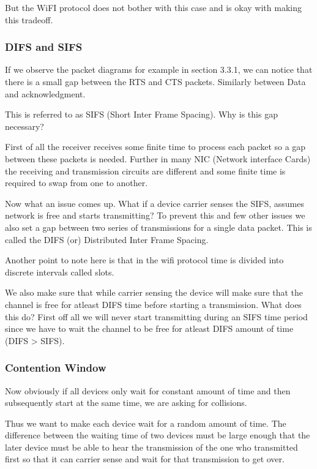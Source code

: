 \documentclass[12pt]{article}
\begin{document}
But the WiFI protocol does not bother with this case and is okay with making this tradeoff. 


\subsubsection{DIFS and SIFS}

If we observe the packet diagrams for example in section 3.3.1, we can notice that there 
is a small gap between the RTS and CTS packets. Similarly between Data and acknowledgment. 

This is referred to as SIFS (Short Inter Frame Spacing). Why is this gap necessary? 

First of all the receiver receives some finite time to process each packet so a gap between these 
packets is needed. Further in many NIC (Network interface Cards) the receiving and 
transmission circuits are different and some finite time is required to swap from one to another.

Now what an issue comes up. What if a device carrier senses the SIFS, assumes network is free and starts transmitting? 
To prevent this and few other issues we also set a gap between two series of transmissions for a single 
data packet. This is called the DIFS (or) Distributed Inter Frame Spacing. 

Another point to note here is that in the wifi protocol time is divided into discrete intervals called slots. 

We also make sure that while carrier sensing the device will make sure that the channel is free for atleast DIFS time 
before starting a transmission. What does this do? First off all we will never start transmitting during an SIFS time period
since we have to wait the channel to be free for atleast DIFS amount of time (DIFS > SIFS). 


\subsubsection{Contention Window}
Now obviously if all devices only wait for constant amount of time and then subsequently 
start at the same time, we are asking for collisions. 

Thus we want to make each device wait for a random amount of time. The difference between the waiting time of 
two devices must be large enough that the later device must be able to hear the transmission of the 
one who transmitted first so that it can carrier sense and wait for that transmission to get over. 
\end{document}
